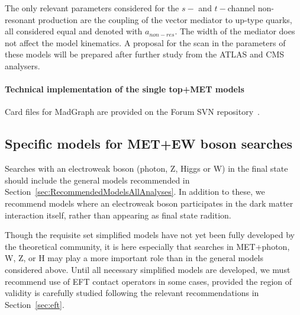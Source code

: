 \documentclass[a4,debug,notitlepage,nobib]{tufte-handout}
\newif\ifATLAS
\newif\ifCMS
\begin{document}
The only relevant parameters considered for the $s-$ and $t-$channel non-resonant production 
are the coupling of the vector mediator to up-type quarks, all considered equal and denoted with $a_{non-res}$. 
The width of the mediator does not affect the model kinematics. 
A proposal for the scan in the parameters of these models will be prepared after further study 
from the ATLAS and CMS analysers. 

\paragraph{Technical implementation of the single top+MET models} 

Card files for MadGraph are provided on the Forum SVN repository~\cite{ForumSVN_EWMonoTop}.


% 



\subsection{Specific models for MET+EW boson searches}

Searches with an electroweak boson (photon, Z, Higgs or W) in the
final state should include the general models recommended in
Section~\ref{sec:RecommendedModelsAllAnalyses}. In addition to these,
we recommend models where an electroweak boson participates in
the dark matter interaction itself, rather than appearing as final
state radition.

Though the requisite set simplified models have not yet been fully
developed by the theoretical community, it is here especially that
searches in MET+photon, W, Z, or H may play a more important role than
in the general models considered above. Until all necessary simplified models
are developed, we must recommend use of EFT contact operators
in some cases, provided the region of validity is carefully studied
following the relevant recommendations in Section~\ref{sec:eft}.

\end{document}
